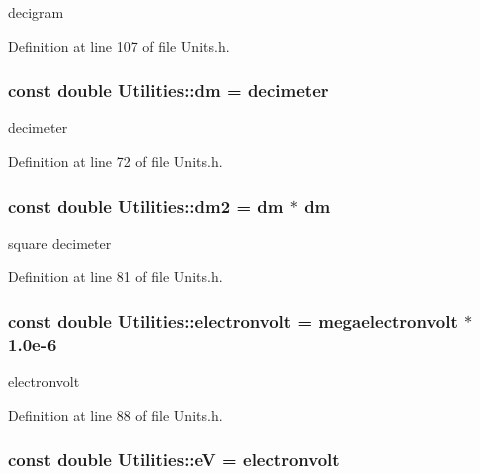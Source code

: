 decigram 



Definition at line 107 of file Units.h.

\hypertarget{namespace_utilities_a811d072b0676c0e47666a99c20fb5eee}{
\subsubsection[{dm}]{\setlength{\rightskip}{0pt plus 5cm}const double {\bf Utilities::dm} = {\bf decimeter}}}
\label{namespace_utilities_a811d072b0676c0e47666a99c20fb5eee}


decimeter 



Definition at line 72 of file Units.h.

\hypertarget{namespace_utilities_a4221fcd40efde1b0ac518ca98c9b8371}{
\subsubsection[{dm2}]{\setlength{\rightskip}{0pt plus 5cm}const double {\bf Utilities::dm2} = {\bf dm} $\ast$ {\bf dm}}}
\label{namespace_utilities_a4221fcd40efde1b0ac518ca98c9b8371}


square decimeter 



Definition at line 81 of file Units.h.

\hypertarget{namespace_utilities_a0045e627e65f14bccdf9ba29f46f4b39}{
\subsubsection[{electronvolt}]{\setlength{\rightskip}{0pt plus 5cm}const double {\bf Utilities::electronvolt} = {\bf megaelectronvolt} $\ast$ 1.0e-\/6}}
\label{namespace_utilities_a0045e627e65f14bccdf9ba29f46f4b39}


electronvolt 



Definition at line 88 of file Units.h.

\hypertarget{namespace_utilities_a373e9baeec7c88baef6b6ba4f782097b}{
\subsubsection[{eV}]{\setlength{\rightskip}{0pt plus 5cm}const double {\bf Utilities::eV} = {\bf electronvolt}}}
\label{namespace_utilities_a373e9baeec7c88baef6b6ba4f782097b}


